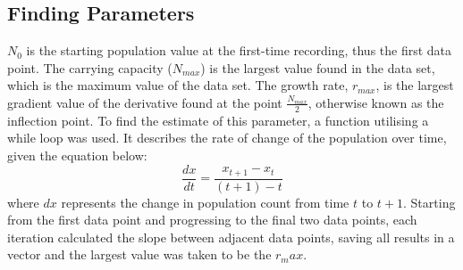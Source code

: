 \subsection{Finding Parameters}

$N_0$ is the starting population value at the first-time recording, thus the first data point. The carrying capacity ($N_{max}$) is the largest value found in the data set, which is the maximum value of the data set. The growth rate, $r_{max}$, is the largest gradient value of the derivative found at the point $\frac{N_{max}}{2}$, otherwise known as the inflection point. To find the estimate of this parameter, a function utilising a while loop was used. It describes the rate of change of the population over time, given the equation below:
\begin{equation*}
    \frac{dx}{dt}=\frac{x_{t+1}-x_{t}}{(t+1)-t}\label{eq:slope} \tag{4}
\end{equation*}
where $dx$ represents the change in population count from time $t$ to $t+1$. Starting from the first data point and progressing to the final two data points, each iteration calculated the slope between adjacent data points, saving all results in a vector and the largest value was taken to be the $r_max$.

